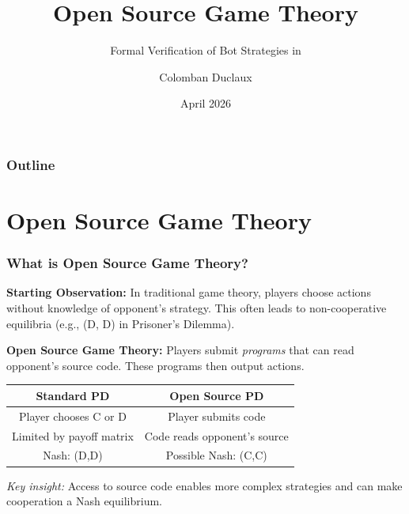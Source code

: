\documentclass[t,11pt]{beamer}
\title{Open Source Game Theory}
\subtitle{Formal Verification of Bot Strategies in \pd}
\author{Colomban Duclaux}
\institute{ETH Zurich}
\date{April 2026}
\begin{document}
\frame{\titlepage}

\begin{frame}
  \frametitle{Outline}
  \tableofcontents
\end{frame}

\section{Open Source Game Theory}

\begin{frame}
  \frametitle{What is Open Source Game Theory?}

  \textbf{Starting Observation:} In traditional game theory, players choose actions without knowledge of opponent's strategy. This often leads to non-cooperative equilibria (e.g., (D, D) in Prisoner's Dilemma).
  
  \vspace{0.2cm}
  
  \textbf{Open Source Game Theory:} Players submit \emph{programs} that can read opponent's source code. These programs then output actions.
  
  \vspace{0.3cm}
  
  \begin{center}
    \begin{tabular}{cc}
      \hline
      \textbf{Standard PD} & \textbf{Open Source PD} \\
      \hline
      Player chooses C or D & Player submits code \\
      Limited by payoff matrix & Code reads opponent's source \\
      Nash: (D,D) & Possible Nash: (C,C) \\
      \hline
    \end{tabular}
  \end{center}
  
  \vspace{0.5cm}
  
  \small\textit{Key insight:} Access to source code enables more complex strategies and can make cooperation a Nash equilibrium.

\end{frame}
\end{document}
